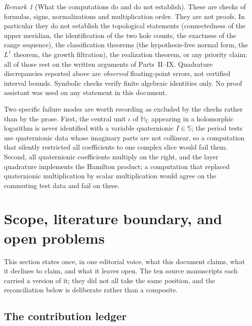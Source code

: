 \documentclass[11pt,a4paper]{article}
\numberwithin{equation}{section}
\theoremstyle{definition}
\theoremstyle{remark}
\newtheorem{remark}[theorem]{Remark}
\theoremstyle{plain}
\newcommand{\HC}{\mathbb H_{\mathbb C}}
\newcommand{\SSS}{\mathbb S}
\begin{document}
\begin{remark}[What the computations do and do not establish]
\label{f:rem:disclaimer}
These are checks of formulas, signs, normalizations and multiplication
order. They are not proofs. In particular they do not establish the
topological statements (connectedness of the upper meridian, the
identification of the two hole counts, the exactness of the range
sequence), the classification theorems (the hypothesis-free normal form,
the $L^1$ theorem, the growth filtration), the realization theorem, or any
priority claim; all of those rest on the written arguments of
Parts~II--IX. Quadrature discrepancies reported above are \emph{observed}
floating-point errors, not certified interval bounds. Symbolic checks
verify finite algebraic identities only. No proof assistant was used on any
statement in this document.

Two specific failure modes are worth recording as excluded by the checks
rather than by the prose. First, the central unit $\iota$ of $\HC$ appearing
in a holomorphic logarithm is never identified with a variable quaternionic
$I\in\SSS$; the period tests use quaternionic data whose imaginary parts are
not collinear, so a computation that silently restricted all coefficients to
one complex slice would fail them. Second, all quaternionic coefficients
multiply on the right, and the layer quadrature implements the Hamilton
product; a computation that replaced quaternionic multiplication by scalar
multiplication would agree on the commuting test data and fail on these.
\end{remark}

\section{Scope, literature boundary, and open problems}
\label{f:sec:scope}

This section states once, in one editorial voice, what this document claims,
what it declines to claim, and what it leaves open. The ten source
manuscripts each carried a version of it; they did not all take the same
position, and the reconciliation below is deliberate rather than a
composite.

\subsection{The contribution ledger}
\label{f:sub:ledger}
\end{document}
